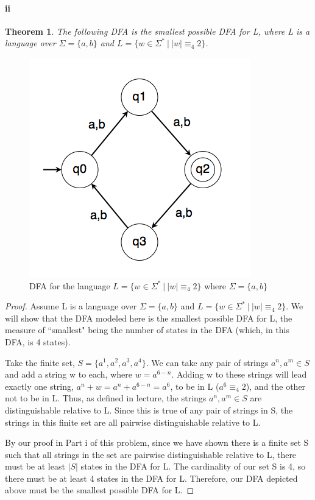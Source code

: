 \documentclass[10pt,letter]{article}
\newtheorem*{thm}{Theorem}
\begin{document}
\paragraph{ii}
\begin{thm} The following DFA is the smallest possible DFA for L, where L is a language over $\Sigma = \{a,b\}$ and $L=\{w \in \Sigma^*\ |\ |w| \equiv_4 2\}$.\end{thm}

\begin{figure}[h]
    \centering
    \includegraphics[width=0.4\linewidth]{hw6_4ii.png}
    \caption{DFA for the language $L=\{w \in \Sigma^*\ |\ |w| \equiv_4 2\}$ where $\Sigma = \{a,b\}$}
    \label{fig:q4ii}
\end{figure}

\begin{proof} Assume L is a language over $\Sigma = \{a,b\}$ and $L=\{w \in \Sigma^*\ |\ |w| \equiv_4 2\}$. We will show that the DFA modeled here is the smallest possible DFA for L, the measure of ``smallest" being the number of states in the DFA (which, in this DFA, is 4 states). 

Take the finite set, $S = \{a^1, a^2, a^3, a^4\}$. We can take any pair of strings $a^n, a^m \in S$ and add a string w to each, where $w = a^{6-n}$. Adding w to these strings will lead exactly one string, $a^n + w = a^n+a^{6-n} = a^6$, to be in L ($a^6 \equiv_4 2$), and the other not to be in L. Thus, as defined in lecture, the strings $a^n, a^m \in S$ are distinguishable relative to L. Since this is true of any pair of strings in S, the strings in this finite set are all pairwise distinguishable relative to L.

By our proof in Part i of this problem, since we have shown there is a finite set S such that all strings in the set are pairwise distinguishable relative to L, there must be at least $|S|$ states in the DFA for L. The cardinality of our set S is 4, so there must be at least 4 states in the DFA for L. Therefore, our DFA depicted above must be the smallest possible DFA for L. 
\end{proof}
\end{document}
